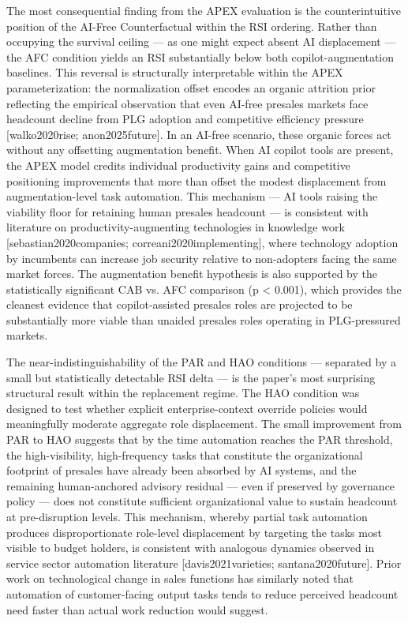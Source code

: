 \documentclass[10pt, conference]{IEEEtran}
\begin{document}
\label{sec:discussion}

The most consequential finding from the APEX evaluation is the counterintuitive position of the AI-Free Counterfactual within the RSI ordering. Rather than occupying the survival ceiling --- as one might expect absent AI displacement --- the AFC condition yields an RSI substantially below both copilot-augmentation baselines. This reversal is structurally interpretable within the APEX parameterization: the normalization offset encodes an organic attrition prior reflecting the empirical observation that even AI-free presales markets face headcount decline from PLG adoption and competitive efficiency pressure [walko2020rise; anon2025future]. In an AI-free scenario, these organic forces act without any offsetting augmentation benefit. When AI copilot tools are present, the APEX model credits individual productivity gains and competitive positioning improvements that more than offset the modest displacement from augmentation-level task automation. This mechanism --- AI tools raising the viability floor for retaining human presales headcount --- is consistent with literature on productivity-augmenting technologies in knowledge work [sebastian2020companies; correani2020implementing], where technology adoption by incumbents can increase job security relative to non-adopters facing the same market forces. The augmentation benefit hypothesis is also supported by the statistically significant CAB vs. AFC comparison (p < 0.001), which provides the cleanest evidence that copilot-assisted presales roles are projected to be substantially more viable than unaided presales roles operating in PLG-pressured markets.

The near-indistinguishability of the PAR and HAO conditions --- separated by a small but statistically detectable RSI delta --- is the paper's most surprising structural result within the replacement regime. The HAO condition was designed to test whether explicit enterprise-context override policies would meaningfully moderate aggregate role displacement. The small improvement from PAR to HAO suggests that by the time automation reaches the PAR threshold, the high-visibility, high-frequency tasks that constitute the organizational footprint of presales have already been absorbed by AI systems, and the remaining human-anchored advisory residual --- even if preserved by governance policy --- does not constitute sufficient organizational value to sustain headcount at pre-disruption levels. This mechanism, whereby partial task automation produces disproportionate role-level displacement by targeting the tasks most visible to budget holders, is consistent with analogous dynamics observed in service sector automation literature [davis2021varieties; santana2020future]. Prior work on technological change in sales functions \cite{groene2024introduction} has similarly noted that automation of customer-facing output tasks tends to reduce perceived headcount need faster than actual work reduction would suggest.
\end{document}
